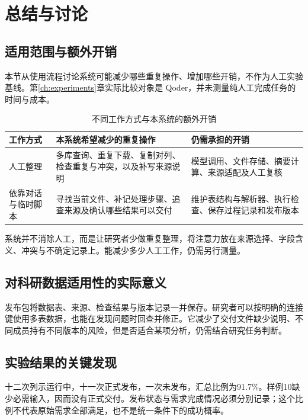 \chapter{总结与讨论}

\section{适用范围与额外开销}

本节从使用流程讨论系统可能减少哪些重复操作、增加哪些开销，不作为人工实验基线。第\ref{ch:experiments}章实际比较对象是 Qoder，并未测量纯人工完成任务的时间与成本。

\begin{table}[htbp]
\centering
\caption{不同工作方式与本系统的额外开销}\label{tab:benefit-cost}
\begin{tabularx}{\linewidth}{>{\hsize}L>{\hsize}L>{\hsize}L}
\toprule
\textbf{工作方式} & \textbf{本系统希望减少的重复操作} & \textbf{仍需承担的开销} \\
\midrule
人工整理 & 多库查询、重复下载、复制对列、检查重复与冲突，以及补写来源说明 & 模型调用、文件存储、摘要计算、来源适配及人工复核 \\
依靠对话与临时脚本 & 寻找当前文件、补记处理步骤、追查来源及确认哪些结果可以交付 & 维护表结构与解析器、执行检查、保存过程记录和发布版本 \\
\bottomrule
\end{tabularx}
\end{table}

系统并不消除人工，而是让研究者少做重复整理，将注意力放在来源选择、字段含义、冲突与不确定记录上。能减少多少人工工作，仍需另行测量。

\section{对科研数据适用性的实际意义}

发布包将数据表、来源、检查结果与版本记录一并保存。研究者可以按明确的连接键使用多表数据，也能在发现问题时回查并修正。它减少了交付文件缺少说明、不同成员持有不同版本的风险，但是否适合某项分析，仍需结合研究任务判断。

\section{实验结果的关键发现}\label{sec:findings-validation}

十二次列示运行中，十一次正式发布，一次未发布，汇总比例为91.7\%。样例10缺少必需输入，因而没有正式交付。发布状态与需求完成情况必须分别记录；这个比例不代表原始需求全部满足，也不是统一条件下的成功概率。

